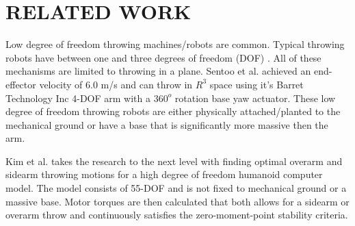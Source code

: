\section{RELATED WORK}

Low degree of freedom throwing machines/robots are common.  
Typical throwing robots have between one and three degrees of freedom (DOF) \cite{509405, Lynch97dynamicnonprehensile, 5152525, 509335, springerlink:10.1007/s10015-006-0401-0}.  
All of these mechanisms are limited to throwing in a plane.   
Sentoo et al.\cite{4651142} achieved an end-effector velocity of 6.0 m/s and can throw in $R^3$ space using it's Barret Technology Inc 4-DOF arm with a $360^o$ rotation base yaw actuator.  
These low degree of freedom throwing robots are either physically attached/planted to the mechanical ground or have a base that is significantly more massive then the arm.  

Kim et al. \cite{JooH2011438} takes the research to the next level with finding optimal overarm and sidearm throwing motions for a high degree of freedom humanoid computer model.  
The model consists of 55-DOF and is not fixed to mechanical ground or a massive base.  
Motor torques are then calculated that both allows for a sidearm or overarm throw and continuously satisfies the zero-moment-point stability criteria\cite{4309277}.  



